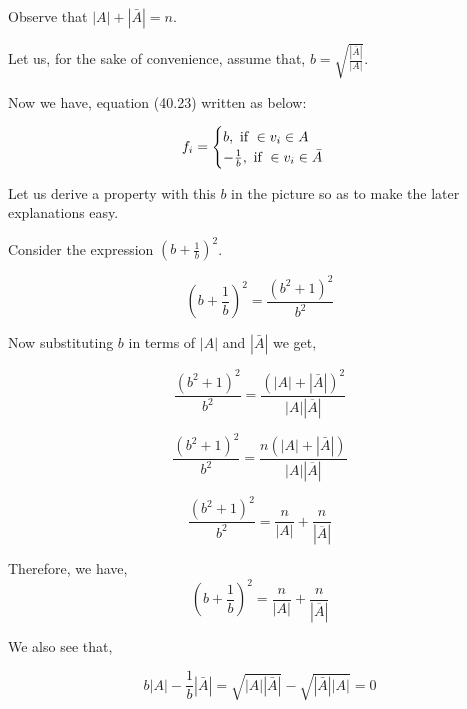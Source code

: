 \documentclass[english]{article}
\theoremstyle{plain}
\begin{document}
Observe that $\left| A \right| + \left| \bar{A} \right| = n$.

Let us, for the sake of convenience, assume that, $b = \sqrt{\frac{\left| \bar{A} \right|}{\left| A \right|}}$.

Now we have, equation (40.23) written as below:

\begin{equation}
f_{i} = 
\begin{cases}
b, \textnormal{ if } \in v_{i} \in A \\
-\frac{1}{b}, \textnormal{ if } \in v_{i} \in \bar{A}
\end{cases}
\end{equation}

Let us derive a property with this $b$ in the picture so as to make the later explanations easy.

Consider the expression $\left( b + \frac{1}{b} \right)^{2}$.

\begin{equation}
\left( b + \frac{1}{b} \right)^{2} = \frac{(b^{2}+1)^{2}}{b^{2}}
\end{equation}

Now substituting $b$ in terms of $\left|A\right|$ and $\left|\bar{A}\right|$ we get,

\begin{equation}
\frac{(b^{2}+1)^{2}}{b^{2}} = \frac{\left(\left|A\right|+\left|\bar{A}\right|\right)^{2}}{\left|A\right|\left|\overline{A}\right|} 
\end{equation}

\begin{equation}
\frac{(b^{2}+1)^{2}}{b^{2}} = \frac{n\left(\left|A\right|+\left|\bar{A}\right|\right)}{\left|A\right|\left|\overline{A}\right|} 
\end{equation}

\begin{equation}
\frac{(b^{2}+1)^{2}}{b^{2}} = \frac{n}{\left|A\right|} + \frac{n}{\left|\overline{A}\right|} 
\end{equation}

Therefore, we have,
\begin{equation}
\left(b+ \frac{1}{b} \right)^{2}= \frac{n}{\left|A\right|} + \frac{n}{\left|\overline{A}\right|} 
\end{equation}

We also see that,

\begin{equation}
b\left|A \right| - \frac{1}{b}\left|\bar{A}\right| = \sqrt{\left|A\right|\left|\bar{A}\right|}-\sqrt{\left|\bar{A}\right|\left|A\right|} = 0
\end{equation}
\end{document}
